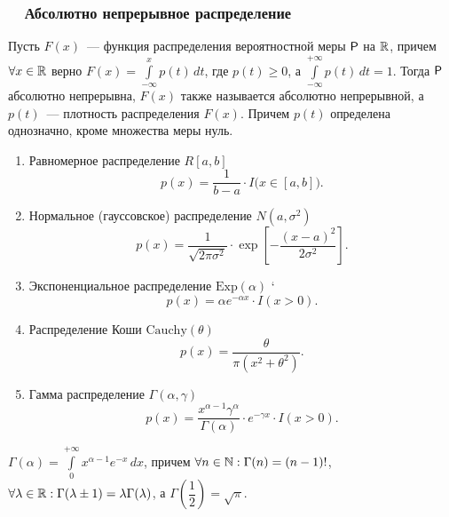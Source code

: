 \subsubsection*{~~Абсолютно непрерывное распределение}
\begin{definition}
	Пусть $F(x)$~--- функция распределения вероятностной меры $\P$ на $\R$, причем $\forall x \in \R$ верно $F(x) = \int\limits_{-\infty}^{x} p(t) \, d t$, где  $p(t) \geqslant 0$, а $\int\limits_{-\infty}^{+\infty} p(t) \, d t = 1$. Тогда $\P$ абсолютно непрерывна, $F(x)$ также называется абсолютно непрерывной, а $p(t)$~--- плотность распределения $F(x)$. Причем $p(t)$ определена однозначно, кроме множества меры нуль.
\end{definition}
\begin{enumerate}
	\item{ Равномерное распределение $R[a,b]$ 
		$$p(x) = \frac{1}{b -a } \cdot I \big( x \in [a,b] \big). $$}
	\item{Нормальное (гауссовское) распределение $N(a, \sigma^2)$
		$$p(x) = \frac{1}{\sqrt{2 \pi \sigma^2}} \cdot \exp \left[ -\frac{(x - a)^2}{2 \sigma^2} \right]. $$}
	\item{Экспоненциальное распределение $\text{Exp}(\alpha)$
	`	$$p(x) = \alpha e^{-\alpha x} \cdot I(x > 0).$$}
	\item{Распределение Коши $\text{Cauchy}(\theta)$
		$$p(x) = \frac{\theta}{\pi \left(x^2 + \theta^2 \right)}.$$}
	\item{ Гамма распределение $\Gamma(\alpha, \gamma)$
		$$p(x) = \frac{x^{\alpha - 1} \gamma^{\alpha}}{\Gamma(\alpha)} \cdot e^{-\gamma x} \cdot I(x > 0).$$}
\end{enumerate}
\begin{definition}
	$\Gamma(\alpha) = \int\limits_0^{+\infty} x^{\alpha - 1} e^{-x} \, d x$, причем $\forall n \in \N : \Gamma(n) = (n - 1)!$, $\forall \lambda \in \R: \Gamma(\lambda \pm 1) = \lambda \Gamma(\lambda)$, а $\Gamma\left(\dfrac{1}{2}\right) = \sqrt{\pi}$.
\end{definition}
